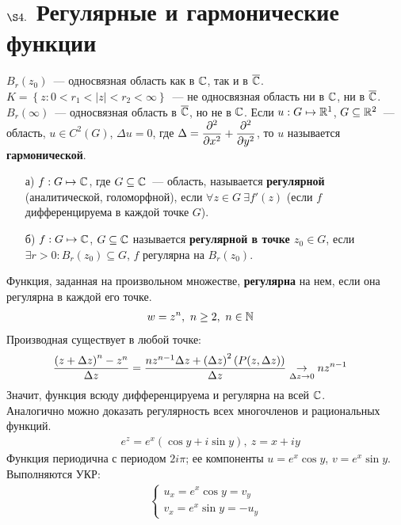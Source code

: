 \section{$\S 4.$ Регулярные и гармонические функции}
\example
$B_r(z_0)$~--- односвязная область как в $\mathbb{C}$, так и в $\overline{\mathbb{C}}$.
\example
$K = \left\{ z: 0 < r_1 < \left| z \right| < r_2 < \infty \right\}$~--- не
односвязная область ни в $\mathbb{C}$, ни в $\overline{\mathbb{C}}$.
\example
$B_r(\infty)$~--- односвязная область в $\overline{\mathbb{C}}$, но не в $\mathbb{C}$.
\Def
Если $u:G \mapsto \mathbb{R}^1$, $G \subseteq \mathbb{R}^2$~--- область, $u \in C^2(G)$,
$\Delta u = 0$, где $\Delta = \displaystyle \frac{\partial^2}{\partial x^2} + \displaystyle
\frac{\partial^2}{\partial y^2}$, то $u$ называется \textbf{гармонической}.
\Def ~
\begin{itemize}
    \item[а)]$f: G \mapsto \mathbb{C}$, где $G \subseteq \mathbb{C}$~--- область, называется
    \textbf{регулярной} (аналитической, голоморфной), если $\forall z \in G \
    \exists f'(z)$ (если $f$ дифференцируема в каждой точке $G$).
    \item[б)]$f: G \mapsto \mathbb{C}$, $G \subseteq \mathbb{C}$ называется
    \textbf{регулярной в точке $z_0 \in G$}, если $\exists r > 0: B_r(z_0)
    \subseteq G$, $f$ регулярна на $B_r(z_0)$.
\end{itemize}
\Def
Функция, заданная на произвольном множестве, \textbf{регулярна} на нем, если она
регулярна в каждой его точке.
\Example
\begin{align*}
  & w = z^n, \ n \geq 2, \ n \in \mathbb{N}
\end{align*}
Производная существует в любой точке:
\begin{align*}
  & \frac{\left( z+\Delta z \right)^n - z^n}{\Delta z} = \frac{nz^{n-1}\Delta z + \left( \Delta z \right)^2\left( P(z, \Delta z) \right)}{\Delta z} \underset{\Delta z \to 0}{\to} nz^{n-1}
\end{align*}
Значит, функция всюду дифференцируема и регулярна на всей $\mathbb{C}$.
\\
Аналогично можно доказать регулярность всех многочленов и рациональных функций.
\Def
\begin{align*}
  & e^z = e^x\left( \cos y + i \sin y \right), \ z = x+iy
\end{align*}
Функция периодична с периодом $2 i \pi$; ее компоненты $u = e^x \cos y$, $v =
e^x \sin y$.
Выполняются УКР:
\begin{align*}
  & \begin{cases}
      u_x = e^x \cos y = v_y \\
      v_x = e^x \sin y = -u_y
  \end{cases}
  & %
\end{align*}
